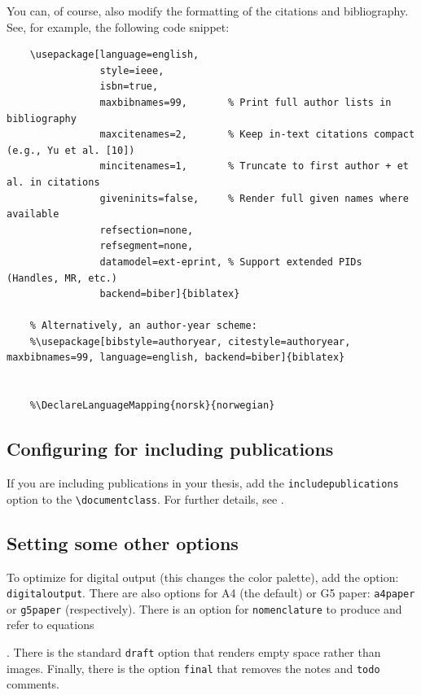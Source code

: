 \documentclass[12pt, twoside]{article}
\newif\ifnomenclature
\begin{document}
You can, of course, also modify the formatting of the citations and bibliography. See, for example, the following code snippet:

\begin{lstlisting}[style=latexExampleForAuthors]
    % Default style (common for engineering theses):
    \usepackage[language=english,
                style=ieee,
                isbn=true,
                maxbibnames=99,       % Print full author lists in bibliography
                maxcitenames=2,       % Keep in-text citations compact (e.g., Yu et al. [10])
                mincitenames=1,       % Truncate to first author + et al. in citations
                giveninits=false,     % Render full given names where available
                refsection=none,
                refsegment=none,
                datamodel=ext-eprint, % Support extended PIDs (Handles, MR, etc.)
                backend=biber]{biblatex}
    
    % Alternatively, an author-year scheme:
    %\usepackage[bibstyle=authoryear, citestyle=authoryear, maxbibnames=99, language=english, backend=biber]{biblatex}
    
    
    %\DeclareLanguageMapping{norsk}{norwegian}
\end{lstlisting}



\subsection{Configuring for including publications}
\label{sec:cycle3aConfigureForIncludingPublications}
If you are including publications in your thesis, add the \texttt{includepublications} option to the \texttt{\textbackslash documentclass}. For further details, see  .

\subsection{Setting some other options}
To optimize for digital output (this changes the color palette), add the option: \texttt{digitaloutput}. There are also options for A4 (the default) or G5 paper: \texttt{a4paper} or \texttt{g5paper} (respectively). There is an option for \texttt{nomenclature} to produce and refer to equations
\ifnomenclature
as shown in \Cref{ch:NomenclatureExamples}
\fi
.  There is the standard \texttt{draft} option that renders empty space rather than images.  Finally, there is the option \texttt{final} that removes the notes and \texttt{todo} comments.
\end{document}
